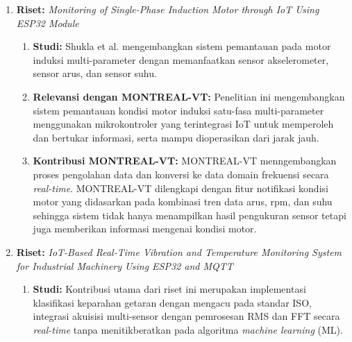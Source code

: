 \documentclass{elsinta}
\begin{document}
\begin{enumerate}
\begin{enumerate}
        \item \textbf{Relevansi dengan  MONTREAL-VT:} Metodologi VAT menjadi dasar dalam proses akuisisi data getaran dari motor induksi. MONTREAL-VT mengadopsi sensor getaran sebagai media pengumpulan data.
        \item \textbf{Kontribusi  MONTREAL-VT:} MONTREAL-VT memperluas pendekatan riset\cite{Sonowal2019} dengan parameter tambahan seperti rpm, suhu, dan arus sehingga proses diagnosis tidak hanya mengandalkan data getaran motor. MONTREAL-VT dibekali sistem peunggahan data berbasis cloud sehingga pengguna dapat mengakses data hasil akuisisi dan diagnosa kondisi motor.
    \end{enumerate}
    \item \textbf{Riset:} \textit{Monitoring of Single-Phase Induction Motor through IoT Using ESP32 Module} \cite{Shukla2022}
    \begin{enumerate}
        \item \textbf{Studi:} Shukla et al. mengembangkan sistem pemantauan pada motor induksi multi-parameter dengan memanfaatkan sensor akselerometer, sensor arus, dan sensor suhu.
        \item \textbf{Relevansi dengan MONTREAL-VT:} Penelitian ini mengembangkan sistem pemantauan kondisi motor induksi satu-fasa multi-parameter menggunakan mikrokontroler yang terintegrasi IoT untuk memperoleh dan bertukar informasi, serta mampu dioperasikan dari jarak jauh.
        \item \textbf{Kontribusi MONTREAL-VT:} MONTREAL-VT menngembangkan proses pengolahan data dan konversi ke data domain frekuensi secara \textit{real-time}. MONTREAL-VT dilengkapi dengan fitur notifikasi kondisi motor yang didasarkan pada kombinasi tren data arus, rpm, dan suhu sehingga sistem tidak hanya menampilkan hasil pengukuran sensor tetapi juga memberikan informasi mengenai kondisi motor.
    \end{enumerate}
    \item \textbf{Riset:} \textit{IoT-Based Real-Time Vibration and Temperature Monitoring System for Industrial Machinery Using ESP32 and MQTT}\cite{Shiddiqi2026}
    \begin{enumerate}
        \item \textbf{Studi:} Kontribusi utama dari riset ini merupakan implementasi klasifikasi keparahan getaran dengan mengacu pada standar ISO, integrasi akuisisi multi-sensor dengan pemrosesan RMS dan FFT secara \textit{real-time} tanpa menitikberatkan pada algoritma \textit{machine learning} (ML).

\end{enumerate}
\end{enumerate}
\end{document}
